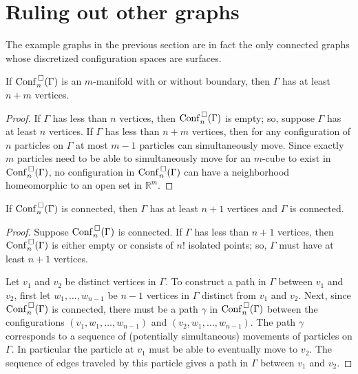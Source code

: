 \section{Ruling out other graphs}
The example graphs in the previous section are in fact the only connected graphs
whose discretized configuration spaces are surfaces.

\begin{lem}
\label{lem:is_surface_0}
If \(\mathrm{Conf}^{\,\square}_n(\Gamma)\) is an \(m\)-manifold with or without boundary, then \(\Gamma\) has at least \(n+m\) vertices.
\end{lem}
\begin{proof}
    If \(\Gamma\) has less than \(n\) vertices, then \(\mathrm{Conf}^{\,\square}_n(\Gamma)\) is empty;
    so, suppose \(\Gamma\) has at least \(n\) vertices.
    If \(\Gamma\) has less than \(n + m\) vertices, then
    for any configuration of \(n\) particles on \(\Gamma\)
    at most \(m-1\) particles can simultaneously move.
    Since exactly \(m\) particles need to be able to simultaneously move for an \(m\)-cube 
    to exist in \(\mathrm{Conf}^{\,\square}_n(\Gamma)\), no configuration in \(\mathrm{Conf}^{\,\square}_n(\Gamma)\)
    can have a neighborhood homeomorphic to an open set in \(\mathbb{R}^m\).
\end{proof}

\begin{lem}
    \label{lem:is_connected_0}
    If \(\mathrm{Conf}^{\,\square}_n(\Gamma)\) is connected, then \(\Gamma\) has at least \(n + 1\) vertices
    and \(\Gamma\) is connected.
\end{lem}
\begin{proof}
    Suppose \(\mathrm{Conf}^{\,\square}_n(\Gamma)\) is connected.
    If \(\Gamma\) has less than \(n + 1\) vertices, then \(\mathrm{Conf}^{\,\square}_n(\Gamma)\) is either empty or
    consists of \(n!\) isolated points; so, \(\Gamma\) must have at least \(n+1\) vertices.

    Let \(v_1\) and \(v_2\) be distinct vertices in \(\Gamma\).
    To construct a path in \(\Gamma\) between \(v_1\) and \(v_2\), first let \(w_1, \ldots, w_{n-1}\)
    be \(n-1\) vertices in \(\Gamma\) distinct from \(v_1\) and \(v_2\).
    Next, since \(\mathrm{Conf}^{\,\square}_n(\Gamma)\) is connected, there must be a path \(\gamma\)
    in \(\mathrm{Conf}^{\,\square}_n(\Gamma)\) between the configurations
    \((v_1, w_1, \ldots, w_{n-1})\) and \((v_2, w_1, \ldots, w_{n-1})\).
    The path \(\gamma\) corresponds to a sequence of (potentially simultaneous) movements of particles on \(\Gamma\).
    In particular the particle at \(v_1\) must be able to eventually move to \(v_2\).
    The sequence of edges traveled by this particle gives a path in \(\Gamma\) between \(v_1\) and \(v_2\).
\end{proof}



